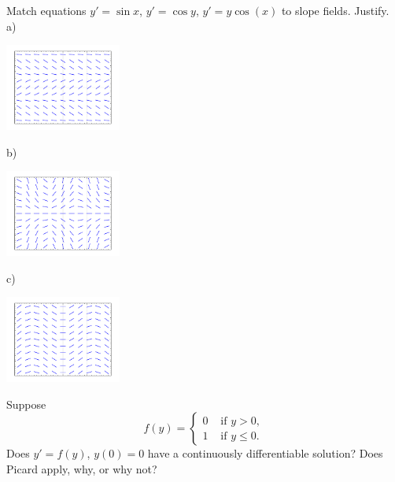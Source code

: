 \documentclass[12pt]{book}
\begin{document}
\begin{exercise}
Match equations $y'=\sin x$, $y'=\cos y$, $y' = y\cos(x)$ to slope fields.
Justify.
\\
a)
\parbox[c]{1.6in}{\includegraphics[width=1.5in]{figures/yprimecosyslope}}
b)
\parbox[c]{1.6in}{\includegraphics[width=1.5in]{figures/yprimecosxyslope}}
c)
\parbox[c]{1.6in}{\includegraphics[width=1.5in]{figures/yprimesinxslope}}
\end{exercise}

\begin{exercise}[tricky]
Suppose
\begin{equation*}
f(y) =
\begin{cases}
0 & \text{ if $y > 0$}, \\
1 & \text{ if $y \leq 0$} .
\end{cases}
\end{equation*}
Does $y' = f(y)$, $y(0) = 0$ have a continuously differentiable solution?  Does Picard apply, why, or
why not?
\end{exercise}

\end{document}
